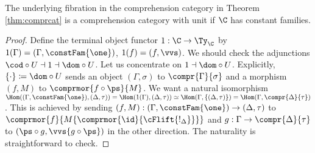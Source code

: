 \documentclass{article}
\begin{document}
\begin{theorem}
  The underlying fibration in the comprehension category in Theorem
  \ref{thm:comprcat} is a comprehension category with unit if $\C$ has
  constant families.
\end{theorem}
\begin{proof}
  Define the terminal object functor $1 : \C \to \Ty_{\C}$ by
  $1(\Gamma) = (\Gamma, \constFam{\one})$, $1(f) = (f, \vvs)$. We
  should check the adjunctions $\cod \circ U \dashv 1 \dashv \dom
  \circ U$. Let us concentrate on $1 \dashv \dom \circ U$. Explicitly,
  $\{\cdot\} \coloneqq \dom \circ U$ sends an object $(\Gamma,
  \sigma)$ to $\compr{\Gamma}{\sigma}$ and a morphism $(f, M)$ to
  $\comprmor{f \circ \ps}{M}$. We want a natural isomorphism
  $\Hom((\Gamma, \constFam{\one}), (\Delta, \tau)) = \Hom(1(\Gamma),
  (\Delta, \tau)) \simeq \Hom(\Gamma, \{(\Delta, \tau)\}) =
  \Hom(\Gamma, \compr{\Delta}{\tau})$.  This is achieved by sending
  $(f, M) : (\Gamma, \constFam{\one}) \to (\Delta, \tau)$ to
  $\comprmor{f}{M\{\comprmor{\id}{\cFlift{!_{\Delta}}}\}}$ and $g :
  \Gamma \to \compr{\Delta}{\tau}$ to $(\ps \circ g, \vvs\{g \circ
  \ps\})$ in the other direction. The naturality is straightforward to
  check.



\end{proof}





\end{document}
